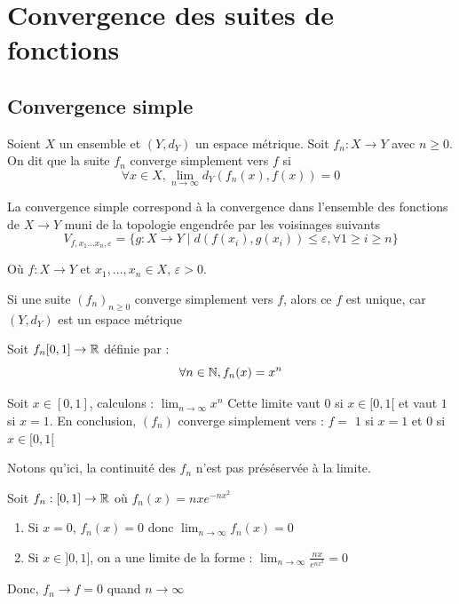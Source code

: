 \chapter{Convergence des suites de fonctions}

\section{Convergence simple}
    \begin{definition}
        Soient $X$ un ensemble et $(Y,d_Y)$ un espace métrique.
        Soit $f_n : X \to Y $ avec $n \ge 0$. 
        On dit que la suite $f_n$ converge simplement vers $f$ si 
        $$ \forall x \in X, \lim_{n\to \infty} d_Y(f_n(x),f(x)) = 0$$
    \end{definition}

    \begin{remarque}
        La convergence simple correspond à la convergence dans l'ensemble des fonctions de $X \to Y$ muni de la topologie engendrée par les voisinages suivants 
        $$ V_{f,x_1...x_n, \varepsilon} = \{ g : X \to Y \; |\; d(f(x_i), g(x_i)) \le \varepsilon, \forall 1\ge i \ge n \}$$

        Où $f : X\to Y$ et $x_1,...,x_n \in X$, $\varepsilon > 0$.
    \end{remarque}


    \begin{remarque}
            Si une suite $(f_n)_{n\ge0}$ converge simplement vers $f$, alors ce $f$ est unique, car $(Y,d_Y)$ est un espace métrique 
    \end{remarque}

    \begin{exemple}
        Soit $f_n [0,1] \to \mathbb{R}$ définie par :
        $$ \forall n \in \mathbb{N}, f_n(x) = x^n$$ 
       
        Soit $x \in [0,1]$, calculons :
        $\lim_{n \to \infty} x^n$
        Cette limite vaut $0$ si $x \in [0,1[$ et vaut $1$ si $x = 1$.
        En conclusion, $(f_n)$ converge simplement vers :
        $f = $ $1$ si $x = 1$ et $0$ si $x \in [0,1[$

        Notons qu'ici, la continuité des $f_n$ n'est pas préséservée à la limite.
    \end{exemple}


    \begin{exemple}
        Soit $f_n : [0,1] \to \mathbb{R}$ où $f_n(x) = nxe^{-nx^2}$
        \begin{enumerate}
            \item Si $x = 0$, $f_n(x) = 0$ donc $\lim_{n \to \infty} f_n(x) = 0$
            \item Si $x \in ]0,1]$, on a une limite de la forme : 
            $\lim_{n \to \infty} \frac{nx}{e^{nx^2}} = 0$ 
        \end{enumerate}
        Donc, $f_n \to f = 0$ quand $ n\to \infty$
    \end{exemple}

